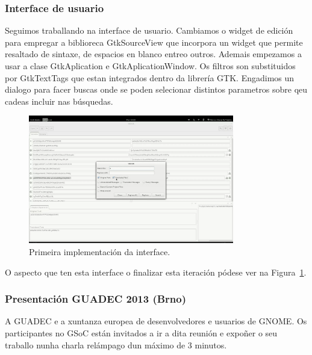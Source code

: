 \subsubsection{Interface de usuario}
Seguimos traballando na interface de usuario. Cambiamos o widget de edición para empregar a biblioreca GtkSourceView que incorpora un widget que permite resaltado de sintaxe, de espacios en blanco entreo outros. Ademais empezamos a usar a clase GtkAplication e GtkAplicationWindow. Os filtros son substituidos por GtkTextTags que estan integrados dentro da librería GTK. Engadimos un dialogo para facer buscas onde se poden selecionar distintos parametros sobre qeu cadeas incluir nas búsquedas.

\begin{figure}[h]
    \centering
    \includegraphics[width=0.8\textwidth]{img/gsoc1_it3_ui.png}
    \caption{Primeira implementación da interface.}
    \label{fig:gsoc1_iter3_ui}
\end{figure}

O aspecto que ten esta interface o finalizar esta iteración pódese ver na Figura~\ref{fig:gsoc1_iter3_ui}.

\subsubsection{Presentación GUADEC 2013 (Brno)}
A GUADEC e a xuntanza europea de desenvolvedores e usuarios de GNOME. Os participantes no GSoC están invitados a ir a dita reunión e expoñer o seu traballo nunha charla relámpago dun máximo de 3 minutos.

